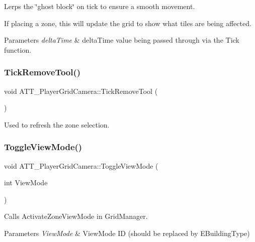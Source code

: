 Lerps the \char`\"{}ghost block\char`\"{} on tick to ensure a smooth movement. 

If placing a zone, this will update the grid to show what tiles are being affected. 
\begin{DoxyParams}{Parameters}
{\em delta\+Time} & delta\+Time value being passed through via the Tick function. \\
\hline
\end{DoxyParams}
\mbox{\label{class_a_t_t___player_grid_camera_a1d0784f96f603f5dae27ff61e329c527}} 
\subsubsection{\texorpdfstring{TickRemoveTool()}{TickRemoveTool()}}
{\footnotesize\ttfamily void A\+T\+T\+\_\+\+Player\+Grid\+Camera\+::\+Tick\+Remove\+Tool (\begin{DoxyParamCaption}{ }\end{DoxyParamCaption})\hspace{0.3cm}{\ttfamily [protected]}}



Used to refresh the zone selection. 

\mbox{\label{class_a_t_t___player_grid_camera_a4a5097bfe8542f4065317a50725d25a7}} 
\subsubsection{\texorpdfstring{ToggleViewMode()}{ToggleViewMode()}}
{\footnotesize\ttfamily void A\+T\+T\+\_\+\+Player\+Grid\+Camera\+::\+Toggle\+View\+Mode (\begin{DoxyParamCaption}\item[{int}]{View\+Mode }\end{DoxyParamCaption})\hspace{0.3cm}{\ttfamily [protected]}}



Calls Activate\+Zone\+View\+Mode in Grid\+Manager. 


\begin{DoxyParams}{Parameters}
{\em View\+Mode} & View\+Mode ID (should be replaced by E\+Building\+Type) \\
\hline
\end{DoxyParams}


